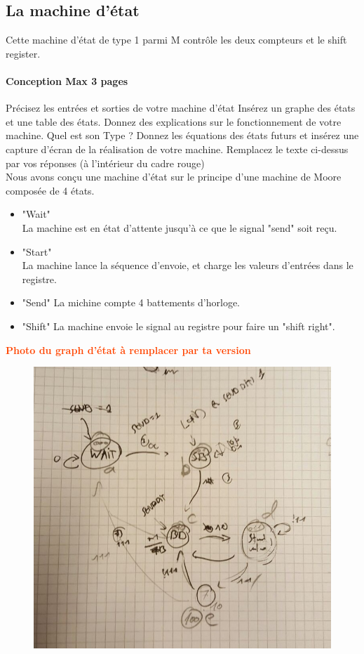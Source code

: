 \documentclass[a4paper]{article} %
\newcommand{\red}[1]{\textbf{\textcolor{OrangeRed}{#1}}}
\begin{document}
\subsection{La machine d’état}
Cette machine d’état de type 1 parmi M contrôle les deux compteurs et le shift register. 
\begin{tcolorbox}[colframe=Monokaimagenta,colback=white, breakable, enhanced]
\paragraph{Conception Max 3 pages}
Précisez les entrées et sorties de votre machine d’état
Insérez un graphe des états et une table des états. Donnez des explications sur le fonctionnement de votre machine. Quel est son Type ?
Donnez les équations des états futurs et insérez une capture d’écran de la réalisation de votre machine.
Remplacez le texte ci-dessus par vos réponses (à l’intérieur du cadre rouge)
\\

Nous avons conçu une machine d'état sur le principe d'une machine de Moore composée de 4 états. 
\begin{itemize}
	\item "Wait"\\
	La machine est en état d'attente jusqu'à ce que le signal "send" soit reçu.
	\item "Start"\\
	La machine lance la séquence d'envoie, et charge les valeurs d'entrées dans le registre.
	\item "Send"
	La michine compte 4 battements d'horloge.
	\item "Shift"
	La machine envoie le signal au registre pour faire un "shift right".
\end{itemize}

\red{Photo du graph d'état à remplacer par ta version}
\begin{figure}[H]
	\centering
	\includegraphics[scale=0.5]{src/graphe_etats}
	\label{fig:graphe_etats}
\end{figure}


\end{tcolorbox}
\end{document}
